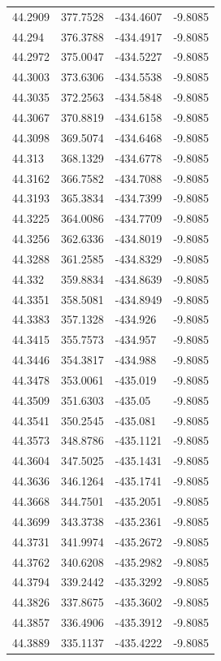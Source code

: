 \begin{table}[H]
\begin{tabular}{llll}
44.2909 & 377.7528 & -434.4607 & -9.8085 \\
44.294 & 376.3788 & -434.4917 & -9.8085 \\
44.2972 & 375.0047 & -434.5227 & -9.8085 \\
44.3003 & 373.6306 & -434.5538 & -9.8085 \\
44.3035 & 372.2563 & -434.5848 & -9.8085 \\
44.3067 & 370.8819 & -434.6158 & -9.8085 \\
44.3098 & 369.5074 & -434.6468 & -9.8085 \\
44.313 & 368.1329 & -434.6778 & -9.8085 \\
44.3162 & 366.7582 & -434.7088 & -9.8085 \\
44.3193 & 365.3834 & -434.7399 & -9.8085 \\
44.3225 & 364.0086 & -434.7709 & -9.8085 \\
44.3256 & 362.6336 & -434.8019 & -9.8085 \\
44.3288 & 361.2585 & -434.8329 & -9.8085 \\
44.332 & 359.8834 & -434.8639 & -9.8085 \\
44.3351 & 358.5081 & -434.8949 & -9.8085 \\
44.3383 & 357.1328 & -434.926 & -9.8085 \\
44.3415 & 355.7573 & -434.957 & -9.8085 \\
44.3446 & 354.3817 & -434.988 & -9.8085 \\
44.3478 & 353.0061 & -435.019 & -9.8085 \\
44.3509 & 351.6303 & -435.05 & -9.8085 \\
44.3541 & 350.2545 & -435.081 & -9.8085 \\
44.3573 & 348.8786 & -435.1121 & -9.8085 \\
44.3604 & 347.5025 & -435.1431 & -9.8085 \\
44.3636 & 346.1264 & -435.1741 & -9.8085 \\
44.3668 & 344.7501 & -435.2051 & -9.8085 \\
44.3699 & 343.3738 & -435.2361 & -9.8085 \\
44.3731 & 341.9974 & -435.2672 & -9.8085 \\
44.3762 & 340.6208 & -435.2982 & -9.8085 \\
44.3794 & 339.2442 & -435.3292 & -9.8085 \\
44.3826 & 337.8675 & -435.3602 & -9.8085 \\
44.3857 & 336.4906 & -435.3912 & -9.8085 \\
44.3889 & 335.1137 & -435.4222 & -9.8085 \\

\end{tabular}
\end{table}
